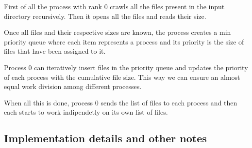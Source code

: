 First of all the process with rank 0 crawls all the files present in the input directory recursively. Then it opens all the files and reads their size. 

Once all files and their respective sizes are known, the process creates a min priority queue where each item represents a process and its priority is the  size of files that have been assigned to it.

Process 0 can iteratively insert files in the priority queue and updates the priority of each process with the cumulative file size. This way we can ensure an almost equal work division among different processes. 

When all this is done, process 0 sends the list of files to each process and then each starts to work indipendetly on its own list of files.



\subsection{Implementation details and other notes}


